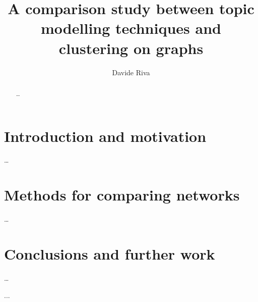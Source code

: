 \documentclass{masterthesis}
\begin{document}
\title{A comparison study between topic modelling techniques and clustering on graphs}

\author{Davide Riva}



\maketitle

\begin{abstract}
    \dots
\end{abstract}

\dedication{To my beloved cat}

\setcounter{tocdepth}{1}
\tableofcontents

\chapter{Introduction and motivation}
\dots




\chapter{Methods for comparing networks}
\dots



\chapter{Conclusions and further work}
\dots

\nocite{*}



\appendix



...


\end{document}
